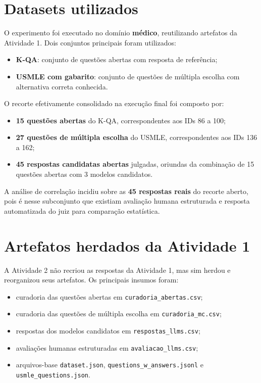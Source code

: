 \documentclass[12pt,a4paper]{article}
\begin{document}
\section{Datasets utilizados}

O experimento foi executado no domínio \textbf{médico}, reutilizando artefatos da Atividade 1. Dois conjuntos principais foram utilizados:

\begin{itemize}[leftmargin=1.2cm]
    \item \textbf{K-QA}: conjunto de questões abertas com resposta de referência;
    \item \textbf{USMLE com gabarito}: conjunto de questões de múltipla escolha com alternativa correta conhecida.
\end{itemize}

O recorte efetivamente consolidado na execução final foi composto por:

\begin{itemize}[leftmargin=1.2cm]
    \item \textbf{15 questões abertas} do K-QA, correspondentes aos IDs 86 a 100;
    \item \textbf{27 questões de múltipla escolha} do USMLE, correspondentes aos IDs 136 a 162;
    \item \textbf{45 respostas candidatas abertas} julgadas, oriundas da combinação de 15 questões abertas com 3 modelos candidatos.
\end{itemize}

A análise de correlação incidiu sobre as \textbf{45 respostas reais} do recorte aberto, pois é nesse subconjunto que existiam avaliação humana estruturada e resposta automatizada do juiz para comparação estatística.

\section{Artefatos herdados da Atividade 1}

A Atividade 2 não recriou as respostas da Atividade 1, mas sim herdou e reorganizou seus artefatos. Os principais insumos foram:

\begin{itemize}[leftmargin=1.2cm]
    \item curadoria das questões abertas em \texttt{curadoria\_abertas.csv};
    \item curadoria das questões de múltipla escolha em \texttt{curadoria\_mc.csv};
    \item respostas dos modelos candidatos em \texttt{respostas\_llms.csv};
    \item avaliações humanas estruturadas em \texttt{avaliacao\_llms.csv};
    \item arquivos-base \texttt{dataset.json}, \texttt{questions\_w\_answers.jsonl} e \texttt{usmle\_questions.json}.
\end{itemize}
\end{document}
